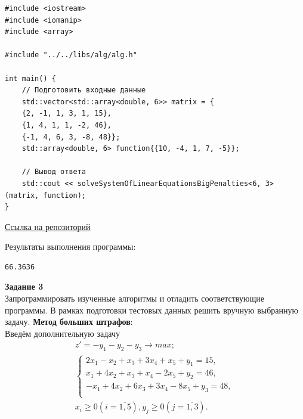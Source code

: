 \documentclass[a4paper,14pt]{extarticle}
\begin{document}
\begin{verbatim}
#include <iostream>
#include <iomanip>
#include <array>

#include "../../libs/alg/alg.h"

int main() {
    // Подготовить входные данные
    std::vector<std::array<double, 6>> matrix = {
    {2, -1, 1, 3, 1, 15},
    {1, 4, 1, 1, -2, 46},
    {-1, 4, 6, 3, -8, 48}};
    std::array<double, 6> function{{10, -4, 1, 7, -5}};

    // Вывод ответа
    std::cout << solveSystemOfLinearEquationsBigPenalties<6, 3>(matrix, function);
}
    \end{verbatim}
\href{https://github.com/IAmProgrammist/operations_research/blob/master/src/lab3/task2/main.cpp}{Ссылка на репозиторий}\bigbreak

Результаты выполнения программы:
\begin{verbatim}
66.3636
\end{verbatim}

\textbf{Задание 3}\\
Запрограммировать изученные алгоритмы и отладить
соответствующие программы. В рамках подготовки тестовых
данных решить вручную выбранную задачу.\bigbreak
\textbf{Метод больших штрафов}:\\
Введём дополнительную задачу\\
\begin{equation*}
    \begin{aligned}
        z' = -y_1-y_2-y_3 \rightarrow max;           \\
        \begin{cases}
            2x_1 - x_2 + x_3 + 3x_4 + x_5 + y_1 = 15,    \\
            x_1 + 4x_2 + x_3 + x_4 - 2x_5 + y_2 = 46,    \\
            -x_1 + 4x_2 + 6x_3 + 3x_4 - 8x_5 + y_3 = 48, \\
        \end{cases} \\
        x_i \geq 0 (i=\overline{1, 5}), y_j \geq 0 (j=\overline{1, 3}).
    \end{aligned}
\end{equation*}\\
\end{document}
